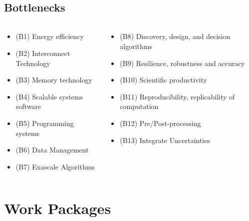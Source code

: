 \subsection{Bottlenecks}
\begin{frame}[fragile=singleslide]{\insertsectionhead}
  \framesubtitle{\insertsubsectionhead}
  \footnotesize
  \begin{columns}[]
    \begin{column}{.5\linewidth}
      \begin{itemize}
        \item (B1) Energy efficiency
        \item (B2) Interconnect Technology
        \item (B3) Memory technology
        \item (B4) Scalable systems software
        \item (B5) Programming systems
        \item (B6) Data Management
        \item (B7) Exascale Algorithms
      \end{itemize}
    \end{column}
    \begin{column}{.5\linewidth}
      \begin{itemize}
        \item (B8) Discovery, design, and decision algorithms
        \item (B9) Resilience, robustness and accuracy
        \item (B10) Scientific productivity
        \item (B11) Reproducibility, replicability of computation
        \item (B12) Pre/Post-processing
        \item (B13) Integrate Uncertainties
      \end{itemize}
    \end{column}
  \end{columns}

  
\end{frame}
\section{Work Packages}
